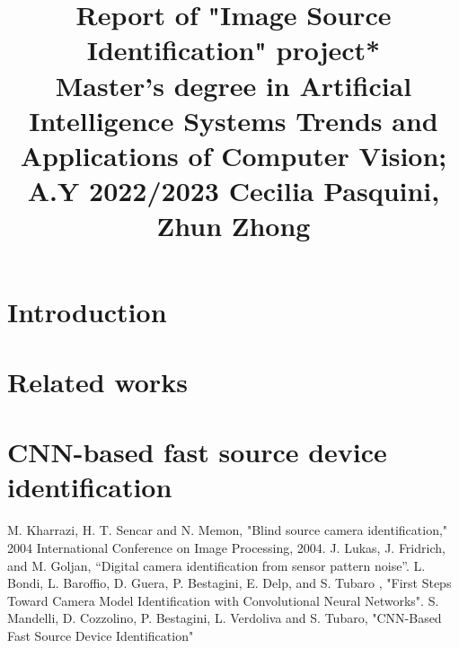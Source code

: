 \documentclass[conference]{IEEEtran}
\begin{document}
\title{Report of "Image Source Identification" project*\\
{\footnotesize Master's degree in Artificial Intelligence Systems\newline
Trends and Applications of Computer Vision; A.Y 2022/2023\newline 
Cecilia Pasquini, Zhun Zhong\newline}
}

\author{

\and
{}

\and
{}

\and
{}
}

\maketitle

\section{Introduction}



\section{Related works}



\section{CNN-based fast source device identification}



\begin{thebibliography}{00}
 M. Kharrazi, H. T. Sencar and N. Memon, "Blind source camera identification," 2004 International Conference on Image Processing, 2004.
 J. Lukas, J. Fridrich, and M. Goljan, “Digital camera identification from sensor pattern noise”.
 L. Bondi, L. Baroffio, D. Guera, P. Bestagini, E. Delp, and S. Tubaro , "First Steps Toward Camera Model Identification with Convolutional Neural Networks".
 S. Mandelli, D. Cozzolino, P. Bestagini, L. Verdoliva and S. Tubaro, "CNN-Based Fast Source Device Identification"
\end{thebibliography}
\vspace{12pt}
\end{document}
